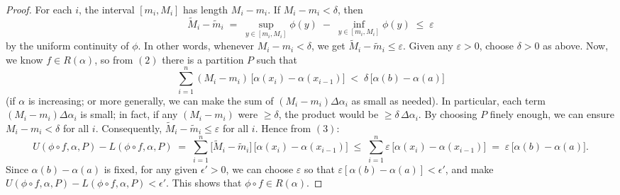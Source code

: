 \documentclass[11pt]{article}
\begin{document}
\begin{exercise}{5}
\begin{proof}
For each $i$, the interval $[m_i,M_i]$ has length $M_i - m_i$.  If $M_i - m_i<\delta$, then 
\[
\widetilde{M}_i - \widetilde{m}_i
\;=\;
\sup_{y\in[m_i,M_i]}\phi(y) 
\;-\;
\inf_{y\in[m_i,M_i]}\phi(y)
\;\le\;
\varepsilon
\]
by the uniform continuity of $\phi$.  In other words, whenever $M_i - m_i<\delta$, we get $\widetilde{M}_i - \widetilde{m}_i \le \varepsilon$.
Given any $\varepsilon>0$, choose $\delta>0$ as above.  Now, we know $f\in R(\alpha)$, so from $(2)$ there is a partition $P$ such that
\[
\sum_{i=1}^n (M_i - m_i)\,\bigl[\alpha(x_i)-\alpha(x_{i-1})\bigr] 
\;<\;
\delta \,\bigl[\alpha(b)-\alpha(a)\bigr]
\]
(if $\alpha$ is increasing; or more generally, we can make the sum of $(M_i - m_i)\Delta\alpha_i$ as small as needed).  In particular, each term $(M_i - m_i)\Delta\alpha_i$ is small; in fact, if any $(M_i - m_i)$ were $\ge\delta$, the product would be $\ge \delta\,\Delta\alpha_i$.  By choosing $P$ finely enough, we can ensure $M_i - m_i<\delta$ for all $i$.  Consequently, $\widetilde{M}_i - \widetilde{m}_i \le \varepsilon$ for all $i$. Hence from $(3)$:
\[
U(\phi\circ f,\alpha,P) - L(\phi\circ f,\alpha,P)
\;=\;
\sum_{i=1}^n \bigl[\widetilde{M}_i - \widetilde{m}_i\bigr]\,
\bigl[\alpha(x_i)-\alpha(x_{i-1})\bigr]
\;\le\;
\sum_{i=1}^n \varepsilon \,\bigl[\alpha(x_i)-\alpha(x_{i-1})\bigr]
\;=\;
\varepsilon\,\bigl[\alpha(b)-\alpha(a)\bigr].
\]
Since $\alpha(b)-\alpha(a)$ is fixed, for any given $\epsilon'>0$, we can choose $\varepsilon$ so that $\varepsilon[\alpha(b)-\alpha(a)]<\epsilon'$, and make $U(\phi\circ f,\alpha,P)-L(\phi\circ f,\alpha,P)<\epsilon'$.  This shows that $\phi\circ f\in R(\alpha)$.
\end{proof}
\end{exercise}
\end{document}
